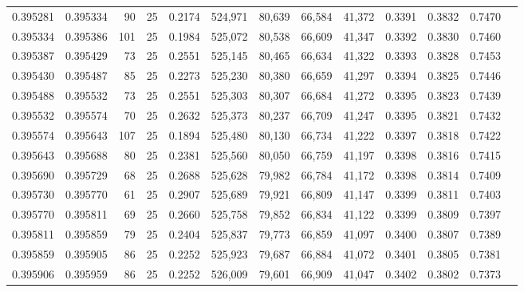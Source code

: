 \begin{tabular}{rrrrrrrrrrrrr}
0.395281 & 0.395334 &    90 &  25 &                                     0.2174 & 524,971 &  80,639 &  66,584 &  41,372 & 0.3391 & 0.3832 & 0.7470 \\
0.395334 & 0.395386 &   101 &  25 &                                     0.1984 & 525,072 &  80,538 &  66,609 &  41,347 & 0.3392 & 0.3830 & 0.7460 \\
0.395387 & 0.395429 &    73 &  25 &                                     0.2551 & 525,145 &  80,465 &  66,634 &  41,322 & 0.3393 & 0.3828 & 0.7453 \\
0.395430 & 0.395487 &    85 &  25 &                                     0.2273 & 525,230 &  80,380 &  66,659 &  41,297 & 0.3394 & 0.3825 & 0.7446 \\
0.395488 & 0.395532 &    73 &  25 &                                     0.2551 & 525,303 &  80,307 &  66,684 &  41,272 & 0.3395 & 0.3823 & 0.7439 \\
0.395532 & 0.395574 &    70 &  25 &                                     0.2632 & 525,373 &  80,237 &  66,709 &  41,247 & 0.3395 & 0.3821 & 0.7432 \\
0.395574 & 0.395643 &   107 &  25 &                                     0.1894 & 525,480 &  80,130 &  66,734 &  41,222 & 0.3397 & 0.3818 & 0.7422 \\
0.395643 & 0.395688 &    80 &  25 &                                     0.2381 & 525,560 &  80,050 &  66,759 &  41,197 & 0.3398 & 0.3816 & 0.7415 \\
0.395690 & 0.395729 &    68 &  25 &                                     0.2688 & 525,628 &  79,982 &  66,784 &  41,172 & 0.3398 & 0.3814 & 0.7409 \\
0.395730 & 0.395770 &    61 &  25 &                                     0.2907 & 525,689 &  79,921 &  66,809 &  41,147 & 0.3399 & 0.3811 & 0.7403 \\
0.395770 & 0.395811 &    69 &  25 &                                     0.2660 & 525,758 &  79,852 &  66,834 &  41,122 & 0.3399 & 0.3809 & 0.7397 \\
0.395811 & 0.395859 &    79 &  25 &                                     0.2404 & 525,837 &  79,773 &  66,859 &  41,097 & 0.3400 & 0.3807 & 0.7389 \\
0.395859 & 0.395905 &    86 &  25 &                                     0.2252 & 525,923 &  79,687 &  66,884 &  41,072 & 0.3401 & 0.3805 & 0.7381 \\
0.395906 & 0.395959 &    86 &  25 &                                     0.2252 & 526,009 &  79,601 &  66,909 &  41,047 & 0.3402 & 0.3802 & 0.7373 \\

\end{tabular}
